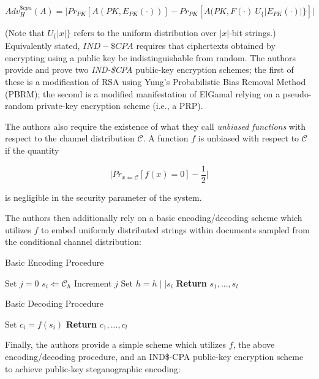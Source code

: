 \documentclass{article}
\begin{document}
\[Adv_H^{\$cpa}(A) = \lvert Pr_{PK}[A(PK, E_{PK}(\cdot))] - Pr_{PK}[A(PK, F(\cdot) ~ U_\{\lvert E_{PK}(\cdot) \rvert\}] \rvert\]

\noindent  (Note that $U_\{\lvert x \rvert\}$ refers to the uniform distribution over $\lvert x \rvert$-bit strings.)  Equivalently stated, 
$IND-\$CPA$ requires that ciphertexts obtained by encrypting using a public key be indistinguishable from random.  The authors 
provide and prove two \textit{IND-\$CPA} public-key encryption schemes; the first of these is a modification of RSA using 
Yung's Probabilistic Bias Removal Method (PBRM); the second is a modified manifestation of ElGamal relying on a pseudo-random 
private-key encryption scheme (i.e., a PRP).

The authors also require the existence of what they call \textit{unbiased functions} with respect to the channel distribution $\mathcal{C}$.
A function $f$ is unbiased with respect to $\mathcal{C}$ if the quantity

\[ \lvert Pr_{x\Leftarrow \mathcal{C}}[f(x) = 0] - \frac{1}{2} \rvert \]

\noindent is negligible in the security parameter of the system.

The authors then additionally rely on a basic encoding/decoding scheme which utilizes $f$ to embed uniformly distributed strings within 
documents sampled from the conditional channel distribution: 

\begin{algorithm}[H]
\caption{Basic Encoding Procedure}\label{1a}
\begin{algorithmic}[1]
\State Set $j = 0$
\State $s_i \Leftarrow \mathcal{C}_h$
\State Increment $j$
\EndWhile
\State Set $h = h \mid \mid s_i$
\EndFor
\State \textbf{Return} $s_1,...,s_l$
\EndProcedure
\end{algorithmic}
\end{algorithm}

\begin{algorithm}[H]
\caption{Basic Decoding Procedure}\label{1a}
\begin{algorithmic}[1]
\State Set $c_i = f(s_i)$
\EndFor
\State \textbf{Return} $c_1,...,c_l$
\EndProcedure
\end{algorithmic}
\end{algorithm}

Finally, the authors provide a simple scheme which utilizes $f$, the above encoding/decoding procedure, and an IND\$-CPA public-key encryption 
scheme to achieve public-key steganographic encoding:
\end{document}
